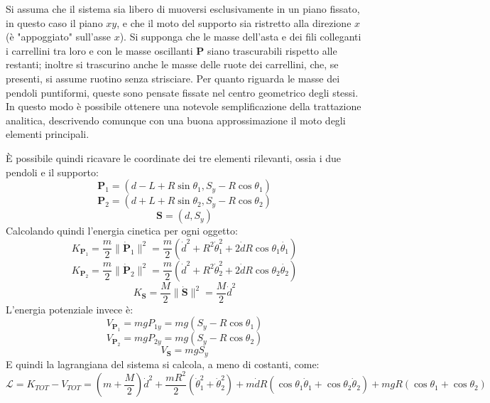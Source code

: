 \documentclass[11pt, a4paper, twoside]{article}
\begin{document}
Si assuma che il sistema sia libero di muoversi esclusivamente in un piano fissato, in questo caso
il piano $xy$, e che il moto del supporto sia ristretto alla direzione $x$ (è "appoggiato" sull'asse $x$).
Si supponga che le masse dell'asta e dei fili colleganti i carrellini tra loro
e con le masse oscillanti $\mathbf{P}$ siano trascurabili rispetto alle restanti; 
inoltre si trascurino anche le masse delle ruote dei carrellini, che, se presenti, si assume ruotino senza strisciare.
Per quanto riguarda le masse dei pendoli puntiformi, queste sono pensate fissate nel centro geometrico degli stessi.
In questo modo è possibile ottenere una notevole semplificazione della trattazione analitica,
descrivendo comunque con una buona approssimazione il moto degli elementi principali.

È possibile quindi ricavare le coordinate dei tre elementi rilevanti, ossia i due pendoli e il supporto:
$$
\mathbf{P}_1 = (d - L + R \sin \theta_1, S_y - R \cos \theta_1 ) 
$$
$$
\mathbf{P}_2 = (d + L + R \sin \theta_2, S_y - R \cos \theta_2 ) 
$$
$$
\mathbf{S} = (d , S_y) 
$$
Calcolando quindi l'energia cinetica per ogni oggetto:
$$
K_{\mathbf{P}_1}=  \frac{m}{2} \lVert \dot{\mathbf{P}}_1 \rVert^2 =  \frac{m}{2}(\dot{d}^2 + R^2 \dot\theta_1^2+ 2\dot{d}R\cos\theta_1 \dot{\theta_1}) 
$$
$$
K_{\mathbf{P}_2} = \frac{m}{2} \lVert \dot{\mathbf{P}}_2 \rVert^2 =  \frac{m}{2}(\dot{d}^2 + R^2 \dot\theta_2^2+ 2\dot{d}R\cos\theta_2 \dot{\theta_2})  
$$
$$
K_{\mathbf{S}} =  \frac{M}{2} \lVert \dot{\mathbf{S}} \rVert^2 = \frac{M}{2} \dot{d}^2
$$
L'energia potenziale invece è:
$$
V_{\mathbf{P}_1}= mg P_{1y} = mg (S_y - R \cos \theta_1 )
$$
$$
V_{\mathbf{P}_2} = mg P_{2y} = mg (S_y - R \cos \theta_2 ) 
$$
$$
V_{\mathbf{S}} = mg S_{y}
$$
E quindi la lagrangiana del sistema si calcola, a meno di costanti, come:
$$
\mathcal{L} = K_{TOT} - V_{TOT} = \left(m+ \frac{M}{2}\right) \dot{d}^2 + \frac{m R^2}{2}  (\dot\theta_1^2 + \dot\theta_2^2) + m \dot{d} R (\cos\theta_1 \dot\theta_1 + \cos \theta_2 \dot \theta_2) + mgR(\cos\theta_1 + \cos \theta_2)
$$
\end{document}
